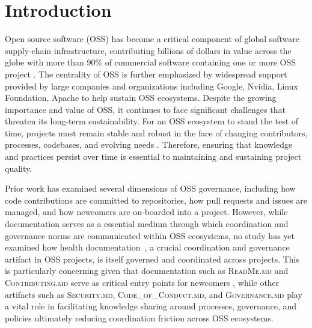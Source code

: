\documentclass[10pt,conference]{IEEEtran}
\begin{document}

\section{Introduction}
Open source software (OSS) has become a critical component of global software supply-chain infrastructure, contributing billions of dollars in value across the globe with more than 90\% of commercial software containing one or more OSS project \cite{hoffmann2024value,nagle2019open}.
The centrality of OSS is further emphasized by widespread support provided by  large companies and organizations including Google, Nvidia, Linux Foundation, Apache \cite{linux_foundation,google_opensource,apache_foundation} to help sustain OSS ecosystems. Despite the growing importance and value of OSS, it continues to face significant challenges that threaten its long-term sustainability. 
For an OSS ecosystem to stand the test of time, projects must remain stable and robust in the face of changing contributors, processes, codebases, and evolving needs \cite{bouktif2014predicting,destefanis2025introducing}. 
Therefore, ensuring that knowledge and practices persist over time is  essential to maintaining and sustaining project quality.


Prior work has examined several dimensions of OSS governance, including how code contributions are committed to repositories, how pull requests and issues are managed, and how newcomers are on-boarded into a project\cite{aufiero2026coordination,arya2019analysis,steinmacher2014attracting,alami2021pull}. 
However, while documentation serves as a essential medium through which coordination and governance norms are communicated within OSS ecosystems, no study has yet examined how health documentation~\cite{github_community_health}, a crucial coordination and governance artifact in OSS projects, is itself governed and coordinated across projects.
This is particularly concerning given that documentation such as \textsc{ReadMe.md} and \textsc{Contributing.md} serve as critical entry points for newcomers \cite{gaughan2025introduction, adejumo2026bridging}, while other artifacts such as \textsc{Security.md}, \textsc{Code\_of\_Conduct.md}, and \textsc{Governance.md} \cite{github_community_health} play a vital role in facilitating knowledge sharing around processes, governance, and policies ultimately reducing coordination friction across OSS ecosystems. 
\end{document}
